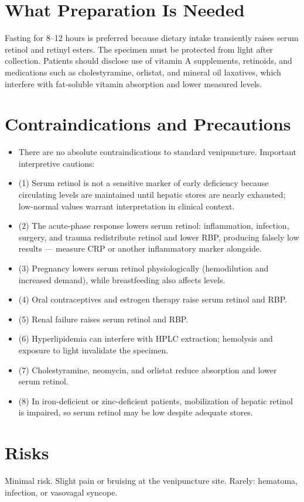 \section*{What Preparation Is Needed}
Fasting for 8--12 hours is preferred because dietary intake transiently raises serum retinol and retinyl esters. The specimen must be protected from light after collection. Patients should disclose use of vitamin A supplements, retinoids, and medications such as cholestyramine, orlistat, and mineral oil laxatives, which interfere with fat-soluble vitamin absorption and lower measured levels.

\section*{Contraindications and Precautions}
\begin{itemize}
  \item There are no absolute contraindications to standard venipuncture. Important interpretive cautions:
  \item (1) Serum retinol is not a sensitive marker of early deficiency because circulating levels are maintained until hepatic stores are nearly exhausted; low-normal values warrant interpretation in clinical context.
  \item (2) The acute-phase response lowers serum retinol: inflammation, infection, surgery, and trauma redistribute retinol and lower RBP, producing falsely low results --- measure CRP or another inflammatory marker alongside.
  \item (3) Pregnancy lowers serum retinol physiologically (hemodilution and increased demand), while breastfeeding also affects levels.
  \item (4) Oral contraceptives and estrogen therapy raise serum retinol and RBP.
  \item (5) Renal failure raises serum retinol and RBP.
  \item (6) Hyperlipidemia can interfere with HPLC extraction; hemolysis and exposure to light invalidate the specimen.
  \item (7) Cholestyramine, neomycin, and orlistat reduce absorption and lower serum retinol.
  \item (8) In iron-deficient or zinc-deficient patients, mobilization of hepatic retinol is impaired, so serum retinol may be low despite adequate stores.
\end{itemize}
\section*{Risks}
Minimal risk. Slight pain or bruising at the venipuncture site. Rarely: hematoma, infection, or vasovagal syncope.

